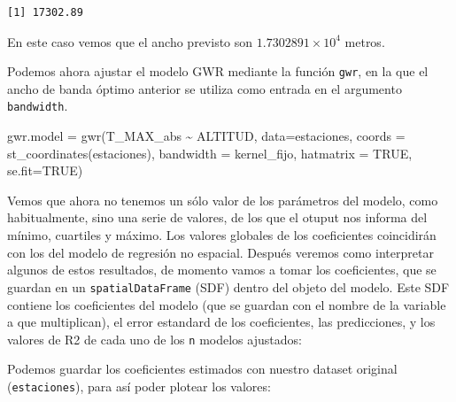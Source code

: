 \documentclass[
  letterpaper,
  DIV=11,
  numbers=noendperiod]{scrreprt}
\newenvironment{Shaded}{\begin{snugshade}}{\end{snugshade}}
\newcommand{\AttributeTok}[1]{\textcolor[rgb]{0.40,0.45,0.13}{#1}}
\newcommand{\ConstantTok}[1]{\textcolor[rgb]{0.56,0.35,0.01}{#1}}
\newcommand{\FunctionTok}[1]{\textcolor[rgb]{0.28,0.35,0.67}{#1}}
\newcommand{\NormalTok}[1]{\textcolor[rgb]{0.00,0.23,0.31}{#1}}
\newcommand{\OtherTok}[1]{\textcolor[rgb]{0.00,0.23,0.31}{#1}}
\newcommand{\SpecialCharTok}[1]{\textcolor[rgb]{0.37,0.37,0.37}{#1}}
\begin{document}
\begin{verbatim}
[1] 17302.89
\end{verbatim}

En este caso vemos que el ancho previsto son
\ensuremath{1.7302891\times 10^{4}} metros.

Podemos ahora ajustar el modelo GWR mediante la función \texttt{gwr}, en
la que el ancho de banda óptimo anterior se utiliza como entrada en el
argumento \texttt{bandwidth}.

\begin{Shaded}
\begin{Highlighting}[]
\NormalTok{gwr.model }\OtherTok{=} \FunctionTok{gwr}\NormalTok{(T\_MAX\_abs }\SpecialCharTok{\textasciitilde{}}\NormalTok{ ALTITUD, }\AttributeTok{data=}\NormalTok{estaciones, }\AttributeTok{coords =} \FunctionTok{st\_coordinates}\NormalTok{(estaciones), }
                \AttributeTok{bandwidth =}\NormalTok{ kernel\_fijo, }
                \AttributeTok{hatmatrix =} \ConstantTok{TRUE}\NormalTok{, }\AttributeTok{se.fit=}\ConstantTok{TRUE}\NormalTok{) }
\end{Highlighting}
\end{Shaded}

Vemos que ahora no tenemos un sólo valor de los parámetros del modelo,
como habitualmente, sino una serie de valores, de los que el otuput nos
informa del mínimo, cuartiles y máximo. Los valores globales de los
coeficientes coincidirán con los del modelo de regresión no espacial.
Después veremos como interpretar algunos de estos resultados, de momento
vamos a tomar los coeficientes, que se guardan en un
\texttt{spatialDataFrame} (SDF) dentro del objeto del modelo. Este SDF
contiene los coeficientes del modelo (que se guardan con el nombre de la
variable a que multiplican), el error estandard de los coeficientes, las
predicciones, y los valores de R2 de cada uno de los \texttt{n} modelos
ajustados:

\begin{Shaded}
\end{Shaded}

Podemos guardar los coeficientes estimados con nuestro dataset original
(\texttt{estaciones}), para así poder plotear los valores:

\begin{Shaded}
\end{Shaded}
\end{document}
